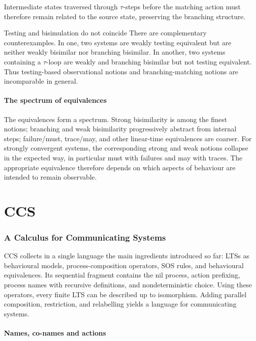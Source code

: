\documentclass[a4paper]{article}
\begin{document}
Intermediate states traversed through \(\tau\)-steps before the matching action must therefore remain related to the source state, preserving the branching structure.

\begin{snippetexample}{Testing and bisimulation do not coincide}
    There are complementary counterexamples.
    In one, two systems are weakly testing equivalent but are neither weakly bisimilar nor branching bisimilar.
    In another, two systems containing a \(\tau\)-loop are weakly and branching bisimilar but not testing equivalent.
    Thus testing-based observational notions and branching-matching notions are incomparable in general.
\end{snippetexample}

\subsection{The spectrum of equivalences}

The equivalences form a spectrum.
Strong bisimilarity is among the finest notions; branching and weak bisimilarity progressively abstract from internal steps; failure/must, trace/may, and other linear-time equivalences are coarser.
For strongly convergent systems, the corresponding strong and weak notions collapse in the expected way, in particular must with failures and may with traces.
The appropriate equivalence therefore depends on which aspects of behaviour are intended to remain observable.

\pagebreak
\part{CCS}

\section{A Calculus for Communicating Systems}

CCS collects in a single language the main ingredients introduced so far: LTSs as behavioural models, process-composition operators, SOS rules, and behavioural equivalences.
Its sequential fragment contains the nil process, action prefixing, process names with recursive definitions, and nondeterministic choice.
Using these operators, every finite LTS can be described up to isomorphism.
Adding parallel composition, restriction, and relabelling yields a language for communicating systems.

\subsection{Names, co-names and actions}
\end{document}
